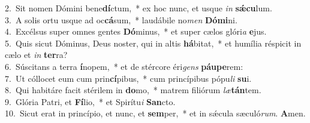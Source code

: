 {2.~}Sit nomen Dómini bene\textbf{dí}ctum,~* ex hoc nunc, et usque \textit{in} \textbf{sǽ}\textbf{cu}lum.\\
{3.~}A solis ortu usque ad oc\textbf{cá}sum,~* laudábile no\textit{men} \textbf{Dó}\textbf{mi}ni.\\
{4.~}Excélsus super omnes gentes \textbf{Dó}minus,~* et super cælos glóri\textit{a} \textbf{e}jus.\\
{5.~}Quis sicut Dóminus, Deus noster, qui in altis \textbf{há}bitat,~* et humília réspicit in cælo et \textit{in} \textbf{ter}ra?\\
{6.~}Súscitans a terra \textbf{í}nopem,~* et de stércore éri\textit{gens} \textbf{páu}\textbf{pe}rem:\\
{7.~}Ut cóllocet eum cum prin\textbf{cí}pibus,~* cum princípibus pópu\textit{li} \textbf{su}i.\\
{8.~}Qui habitáre facit stérilem in \textbf{do}mo,~* matrem filiórum \textit{læ}\textbf{tán}tem.\\
{9.~}Glória Patri, et \textbf{Fí}lio,~* et Spirítu\textit{i} \textbf{San}cto.\\
{10.~}Sicut erat in princípio, et nunc, et \textbf{sem}per,~* et in sǽcula sæculó\textit{rum}. \textbf{A}men.\\
